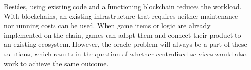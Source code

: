 Besides, using existing code and a functioning blockchain reduces the workload.
With blockchains, an existing infrastructure that requires neither maintenance nor running costs can be used.
When game items or logic are already implemented on the chain, games can adopt them and connect their product to an existing ecosystem. 
However, the oracle problem will always be a part of these solutions, which results in the question of whether centralized services would also work
to achieve the same outcome.